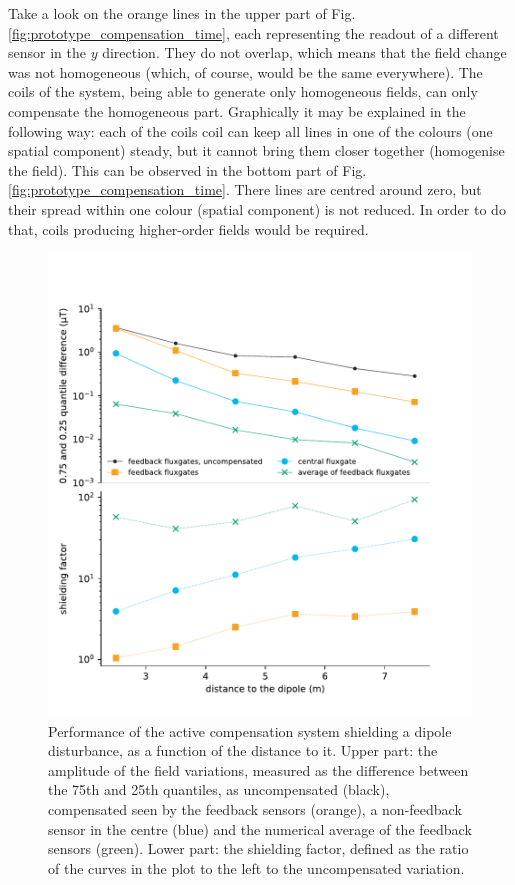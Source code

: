 Take a look on the orange lines in the upper part of Fig.\,\ref{fig:prototype_compensation_time}, each representing the readout of a different sensor in the $y$ direction. They do not overlap, which means that the field change was not homogeneous (which, of course, would be the same everywhere). The coils of the system, being able to generate only homogeneous fields, can only compensate the homogeneous part. Graphically it may be explained in the following way: each of the coils coil can keep all lines in one of the colours (one spatial component) steady, but it cannot bring them closer together (homogenise the field). This can be observed in the bottom part of Fig.\,\ref{fig:prototype_compensation_time}. There lines are centred around zero, but their spread within one colour (spatial component) is not reduced. In order to do that, coils producing higher-order fields would be required.

\begin{figure}
  \centering
  \includegraphics[width=0.85\linewidth]{gfx/prototype/big_magnet_performance_shielding_factor.pdf}
  \caption{Performance of the active compensation system shielding a dipole disturbance, as a function of the distance to it. Upper part: the amplitude of the field variations, measured as the difference between the 75th and 25th quantiles, as uncompensated (black), compensated seen by the feedback sensors (orange), a non-feedback sensor in the centre (blue) and the numerical average of the feedback sensors (green). Lower part: the shielding factor, defined as the ratio of the curves in the plot to the left to the uncompensated variation.}\label{fig:prototype_compensation}
\end{figure}

